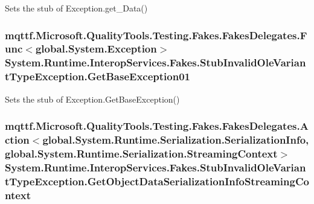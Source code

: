 Sets the stub of Exception.\-get\-\_\-\-Data()

\hypertarget{class_system_1_1_runtime_1_1_interop_services_1_1_fakes_1_1_stub_invalid_ole_variant_type_exception_ac9ba9406e71851ace659bd9a53ccbcc6}{
\subsubsection[{Get\-Base\-Exception01}]{\setlength{\rightskip}{0pt plus 5cm}mqttf.\-Microsoft.\-Quality\-Tools.\-Testing.\-Fakes.\-Fakes\-Delegates.\-Func$<$global.\-System.\-Exception$>$ System.\-Runtime.\-Interop\-Services.\-Fakes.\-Stub\-Invalid\-Ole\-Variant\-Type\-Exception.\-Get\-Base\-Exception01}}\label{class_system_1_1_runtime_1_1_interop_services_1_1_fakes_1_1_stub_invalid_ole_variant_type_exception_ac9ba9406e71851ace659bd9a53ccbcc6}


Sets the stub of Exception.\-Get\-Base\-Exception()

\hypertarget{class_system_1_1_runtime_1_1_interop_services_1_1_fakes_1_1_stub_invalid_ole_variant_type_exception_a45cdc3d554a5adc0f98afbae4879c365}{
\subsubsection[{Get\-Object\-Data\-Serialization\-Info\-Streaming\-Context}]{\setlength{\rightskip}{0pt plus 5cm}mqttf.\-Microsoft.\-Quality\-Tools.\-Testing.\-Fakes.\-Fakes\-Delegates.\-Action$<$global.\-System.\-Runtime.\-Serialization.\-Serialization\-Info, global.\-System.\-Runtime.\-Serialization.\-Streaming\-Context$>$ System.\-Runtime.\-Interop\-Services.\-Fakes.\-Stub\-Invalid\-Ole\-Variant\-Type\-Exception.\-Get\-Object\-Data\-Serialization\-Info\-Streaming\-Context}}\label{class_system_1_1_runtime_1_1_interop_services_1_1_fakes_1_1_stub_invalid_ole_variant_type_exception_a45cdc3d554a5adc0f98afbae4879c365}


